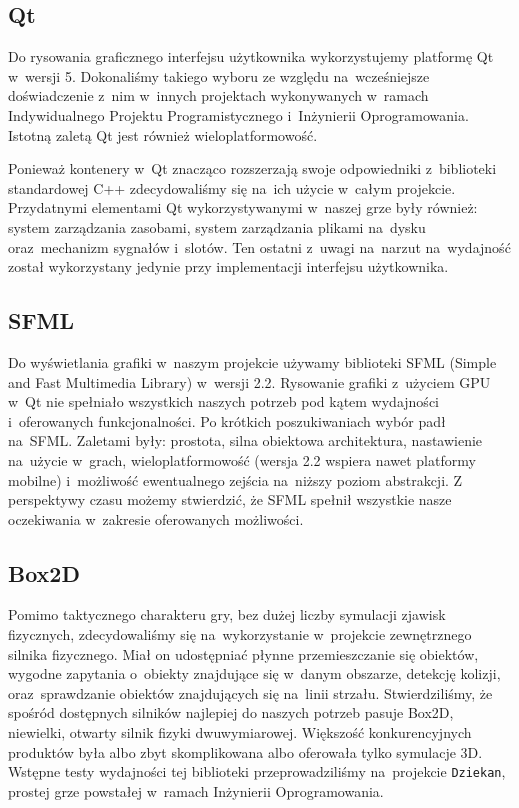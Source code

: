\documentclass[licencjacka]{pracamgr}
\begin{document}
    \subsection{Qt}
      Do rysowania graficznego interfejsu użytkownika wykorzystujemy platformę Qt\cite{QT} w~wersji 5. Dokonaliśmy
      takiego wyboru ze względu na~wcześniejsze doświadczenie z~nim w~innych projektach wykonywanych w~ramach
      Indywidualnego Projektu Programistycznego i~Inżynierii Oprogramowania. Istotną zaletą Qt jest również
      wieloplatformowość.

      Ponieważ kontenery w~Qt znacząco rozszerzają swoje odpowiedniki z~biblioteki standardowej C++ zdecydowaliśmy
      się na~ich użycie w~całym projekcie. Przydatnymi elementami Qt wykorzystywanymi w~naszej grze były również: system
      zarządzania zasobami, system zarządzania plikami na~dysku oraz~mechanizm sygnałów i~slotów. Ten ostatni z~uwagi
      na~narzut na~wydajność został wykorzystany jedynie przy implementacji interfejsu użytkownika.

    \subsection{SFML}
      Do wyświetlania grafiki w~naszym projekcie używamy biblioteki SFML\cite{SFML} (Simple and Fast Multimedia Library)
      w~wersji 2.2. Rysowanie grafiki z~użyciem GPU w~Qt nie spełniało wszystkich naszych potrzeb pod kątem wydajności
      i~oferowanych funkcjonalności. Po krótkich poszukiwaniach wybór padł na~SFML. Zaletami były: prostota, silna
      obiektowa architektura, nastawienie na~użycie w~grach, wieloplatformowość (wersja 2.2 wspiera nawet platformy
      mobilne) i~możliwość ewentualnego zejścia na~niższy poziom abstrakcji. Z perspektywy czasu możemy stwierdzić,
      że SFML spełnił wszystkie nasze oczekiwania w~zakresie oferowanych możliwości.

    \subsection{Box2D}
      Pomimo taktycznego charakteru gry, bez dużej liczby symulacji zjawisk fizycznych, zdecydowaliśmy się na~wykorzystanie
      w~projekcie zewnętrznego silnika fizycznego. Miał on udostępniać płynne przemieszczanie się obiektów, wygodne
      zapytania o~obiekty znajdujące się w~danym obszarze, detekcję kolizji, oraz~sprawdzanie obiektów znajdujących się
      na~linii strzału. Stwierdziliśmy, że spośród dostępnych silników najlepiej do naszych potrzeb pasuje Box2D\cite{BOX},
      niewielki, otwarty silnik fizyki dwuwymiarowej. Większość konkurencyjnych produktów była albo zbyt skomplikowana albo
      oferowała tylko symulacje 3D. Wstępne testy wydajności tej biblioteki przeprowadziliśmy na~projekcie
      \texttt{Dziekan}, prostej grze powstałej w~ramach Inżynierii Oprogramowania.
\end{document}
